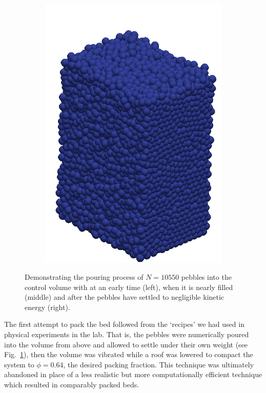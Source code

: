 \begin{figure}[!ht]
\begin{subfigure}[b]{0.25\textwidth}
		\includegraphics[width=\textwidth]{chapters/figures/fill03.png}
	\end{subfigure}
	\caption{Demonstrating the pouring process of $N = 10550$ pebbles into the control volume with at an early time (left), when it is nearly filled (middle) and after the pebbles have settled to negligible kinetic energy (right).}
\label{fig:fill01}
\end{figure}

The first attempt to pack the bed followed from the `recipes' we had used in physical experiments in the lab. That is, the pebbles were numerically poured into the volume from above and allowed to settle under their own weight (see Fig.~\ref{fig:fill01}), then the volume was vibrated while a roof was lowered to compact the system to $\phi = 0.64$, the desired packing fraction. This technique was ultimately abandoned in place of a less realistic but more computationally efficient technique which resulted in comparably packed beds.

